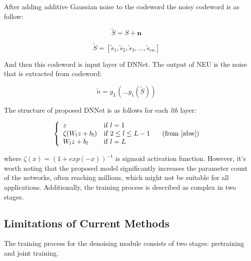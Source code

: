 \documentclass[lettersize,journal]{IEEEtran}
\begin{document}
After adding additive Gaussian noise to the codeword the noisy codeword is as follow:

\begin{equation}
		\tilde{S}=S+\textbf{n}
\end{equation}



\begin{equation}
		\tilde{S}=[\tilde{s}_{1},\tilde{s}_{2},\tilde{s}_{3},...,\tilde{s}_{cw}]
\end{equation}

And then this codeword is input layer of DNNet. The output of NEU is the noise that is extracted from codeword:

\begin{equation}
		\tilde{n}=g_{L}(...g_{1}(\tilde{S})) 
\end{equation}

The structure of proposed DNNet is as follows for each \textit{lth} 
layer:

\begin{equation}
\left\{
\begin{array}{ll}
	z  & \mbox{if } l=1 \\
	\zeta(W_{l}z+b_{l}) & \mbox{if } 2\le l \le L-1  \\
	W_{l}z+b_{l} & \mbox{if } l=L  
\end{array} 
\right.
	\label{eqn:dnnfunction}
	 \quad (\text{from \cite{abw}})
\end{equation}

where \begin{math}  \zeta(x)=(1+exp(-x))^{-1} \end{math} is sigmoid activation function.
However, it's worth noting that the proposed model significantly increases the parameter count of the networks, often reaching millions, which might not be suitable for all applications. Additionally, the training process is described as complex in two stages.
\subsection{Limitations of Current Methods}
The training process for the denoising module consists of two stages: pretraining and joint training.
\end{document}
